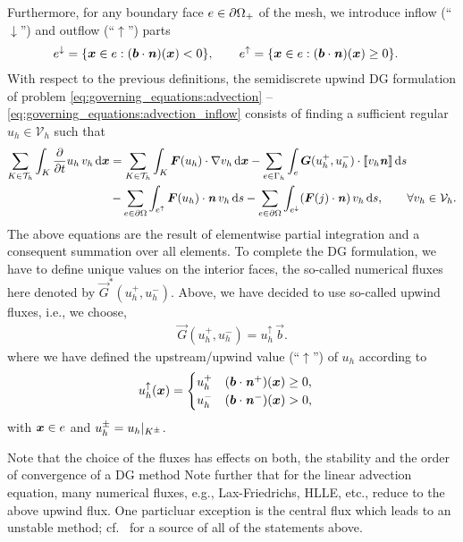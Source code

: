 \documentclass{scrreprt}
\begin{document}
Furthermore, for any boundary face $e\in{{\partial\Omega}_{+}}$
of the mesh, we introduce inflow (``$\downarrow$'') and outflow
(``$\uparrow$'') parts
\begin{align}
e^{\downarrow} &= \{ {\boldsymbol x} \in e :({\boldsymbol b} \cdot
{\boldsymbol {\mathit{n}}})({\boldsymbol x}) < 0\},\qquad
e^{\uparrow} = \{ {\boldsymbol x} \in e : ({\boldsymbol b} \cdot{\boldsymbol {\mathit{n}}})({\boldsymbol x})
\geq 0\}.
\end{align}
With respect to the previous definitions, the semidiscrete upwind DG
formulation of problem \eqref{eq:governing_equations:advection} -- \eqref{eq:governing_equations:advection_inflow}
consists of
finding a sufficient regular $u_h\in\mathcal{V}_h$ such that
\begin{align}
\sum_{K \in \mathcal{T}_h} \int_K \frac{\partial}{\partial t}u_h\,v_h\,\text{d}{\boldsymbol x}
&=
\sum_{K \in \mathcal{T}_h} \int_K {\boldsymbol F}(u_h) \cdot \nabla v_h\,\text{d}{\boldsymbol x}
- \sum_{e \in \Gamma_h} \int_e
{\boldsymbol G}(u_h^{+},u_h^{-})\cdot\llbracket{v_h {\boldsymbol {\mathit{n}}}}\rrbracket\,\text{d}s
\\
&- \sum_{e \in {\partial\Omega}} \int_{e^{\uparrow}}
{\boldsymbol F}(u_h) \cdot {\boldsymbol {\mathit{n}}} \,v_h\,\text{d}s
- \sum_{e \in {\partial\Omega}} \int_{e^{\downarrow}}
({\boldsymbol F}(j)\cdot{\boldsymbol {\mathit{n}}})\,v_h\,\text{d}s,
\qquad\forall v_h \in\mathcal{V}_h.
\notag
\end{align}
The above equations are the result of elementwise partial integration
and a consequent summation over all elements.
To complete the DG formulation, we have to define unique values
on the interior faces, the so-called numerical fluxes here denoted by
$\vec{G}^{*}(u_h^{+},u_h^{-})$.
Above, we have decided to use so-called upwind fluxes, i.e.,
we choose,
\begin{align}
\vec{G}(u_h^{+},u_h^{-}) = u_h^{\uparrow}\,\vec{b}.
\end{align}
where we have defined the upstream/upwind value (``$\uparrow$'')
of $u_h$ according to
\begin{align}
u_h^{\uparrow}({\boldsymbol x}) &=
\begin{cases}
u_h^{+}&({\boldsymbol b} \cdot {\boldsymbol {\mathit{n}}}^{+})({\boldsymbol x}) \geq 0,
\\
u_h^{-}&({\boldsymbol b} \cdot {\boldsymbol {\mathit{n}}}^{-})({\boldsymbol x}) > 0,
\end{cases}
\end{align}
with ${\boldsymbol x} \in e$ and $u_h^{\pm}=u_h|_{K^{\pm}}$.

Note that the choice of the fluxes has effects on both,
the stability and the order of convergence of a DG method
Note further that for the linear advection equation,
many numerical fluxes, e.g., Lax-Friedrichs, HLLE, etc., reduce to the above
upwind flux. One particluar exception is the central flux which leads to an
unstable method; cf.~\cite{hartmann_2008} for a source of all of the statements
above.
\end{document}
